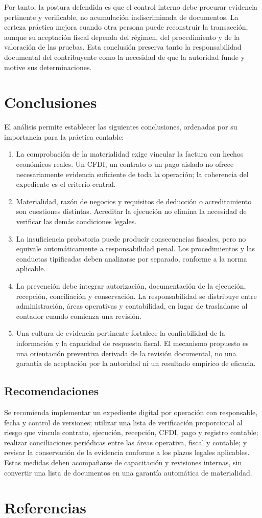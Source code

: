\documentclass[spanish,12pt,letterpaper,oneside]{article}
\begin{document}
Por tanto, la postura defendida es que el control interno debe procurar evidencia pertinente y verificable, no acumulación indiscriminada de documentos. La certeza práctica mejora cuando otra persona puede reconstruir la transacción, aunque su aceptación fiscal dependa del régimen, del procedimiento y de la valoración de las pruebas. Esta conclusión preserva tanto la responsabilidad documental del contribuyente como la necesidad de que la autoridad funde y motive sus determinaciones.

\clearpage
{}
\section{Conclusiones}
El análisis permite establecer las siguientes conclusiones, ordenadas por su importancia para la práctica contable:
\begin{enumerate}
	\item La comprobación de la materialidad exige vincular la factura con hechos económicos reales. Un CFDI, un contrato o un pago aislado no ofrece necesariamente evidencia suficiente de toda la operación; la coherencia del expediente es el criterio central.
	\item Materialidad, razón de negocios y requisitos de deducción o acreditamiento son cuestiones distintas. Acreditar la ejecución no elimina la necesidad de verificar las demás condiciones legales.
	\item La insuficiencia probatoria puede producir consecuencias fiscales, pero no equivale automáticamente a responsabilidad penal. Los procedimientos y las conductas tipificadas deben analizarse por separado, conforme a la norma aplicable.
	\item La prevención debe integrar autorización, documentación de la ejecución, recepción, conciliación y conservación. La responsabilidad se distribuye entre administración, áreas operativas y contabilidad, en lugar de trasladarse al contador cuando comienza una revisión.
	\item Una cultura de evidencia pertinente fortalece la confiabilidad de la información y la capacidad de respuesta fiscal. El mecanismo propuesto es una orientación preventiva derivada de la revisión documental, no una garantía de aceptación por la autoridad ni un resultado empírico de eficacia.
\end{enumerate}

\subsection*{Recomendaciones}
Se recomienda implementar un expediente digital por operación con responsable, fecha y control de versiones; utilizar una lista de verificación proporcional al riesgo que vincule contrato, ejecución, recepción, CFDI, pago y registro contable; realizar conciliaciones periódicas entre las áreas operativa, fiscal y contable; y revisar la conservación de la evidencia conforme a los plazos legales aplicables. Estas medidas deben acompañarse de capacitación y revisiones internas, sin convertir una lista de documentos en una garantía automática de materialidad.

\clearpage
\section{Referencias}
\printbibliography[heading=none]
\end{document}
